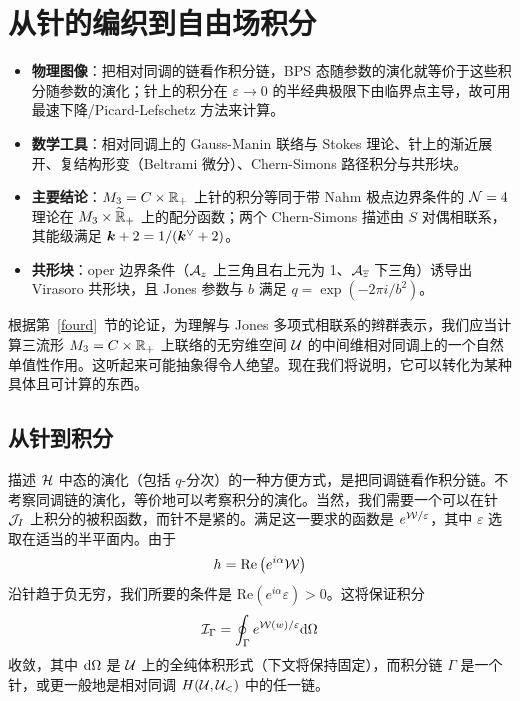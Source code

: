 \section{从针的编织到自由场积分}\label{fthimconformal}
\begin{keytakeaways}
\begin{itemize}\setlength{\itemsep}{2pt}
  \item \textbf{物理图像}：把相对同调的链看作积分链，BPS 态随参数的演化就等价于这些积分随参数的演化；针上的积分在 $\varepsilon\to0$ 的半经典极限下由临界点主导，故可用最速下降/Picard-Lefschetz 方法来计算。
  \item \textbf{数学工具}：相对同调上的 Gauss-Manin 联络与 Stokes 理论、针上的渐近展开、复结构形变（Beltrami 微分）、Chern-Simons 路径积分与共形块。
  \item \textbf{主要结论}：$M_3=C\times{\mathbb R}_+$ 上针的积分等同于带 Nahm 极点边界条件的 ${\mathcal N}=4$ 理论在 $M_3\times\widetilde{{\mathbb R}}_+$ 上的配分函数；两个 Chern-Simons 描述由 $S$ 对偶相联系，其能级满足 ${\boldsymbol{k}}+2=1/({\boldsymbol{k}}^\vee+2)$。
  \item \textbf{共形块}：oper 边界条件（${\mathcal A}_z$ 上三角且右上元为 1、${\mathcal A}_{\overline z}$ 下三角）诱导出 Virasoro 共形块，且 Jones 参数与 $b$ 满足 $q=\exp(-2\pi i/b^2)$。
\end{itemize}
\end{keytakeaways}

根据第~\ref{fourd}~节的论证，为理解与 Jones 多项式相联系的辫群表示，我们应当计算三流形 $M_3=C\times {\mathbb R}_+$ 上联络的无穷维空间 ${\mathcal U}$ 的中间维相对同调上的一个自然单值性作用。这听起来可能抽象得令人绝望。现在我们将说明，它可以转化为某种具体且可计算的东西。


\subsection{从针到积分}\label{fromth}



描述 ${\mathcal H}$ 中态的演化（包括 $q$-分次）的一种方便方式，是把同调链看作积分链。不考察同调链的演化，等价地可以考察积分的演化。当然，我们需要一个可以在针 ${\mathcal J}_I$ 上积分的被积函数，而针不是紧的。满足这一要求的函数是 $e^{{\mathcal W}/\varepsilon}$，其中 $\varepsilon$ 选取在适当的半平面内。由于
\begin{equation}
h = \mathrm{Re} \left( e^{i \alpha} {\mathcal W} \right)
\end{equation}
沿针趋于负无穷，我们所要的条件是 $\mathrm{Re} \left( e^{i \alpha} \varepsilon\right)>0$。这将保证积分
\begin{equation}\label{thelko}
{\mathcal I}_\Gamma = \oint_\Gamma e^{{\mathcal W}(w)/\varepsilon} {\mathrm d} \Omega
\end{equation}
收敛，其中 ${\mathrm d}\Omega$ 是 ${\mathcal U}$ 上的全纯体积形式（下文将保持固定），而积分链 $\Gamma$ 是一个针，或更一般地是相对同调 $H({\mathcal U},{\mathcal U}_<)$ 中的任一链。


